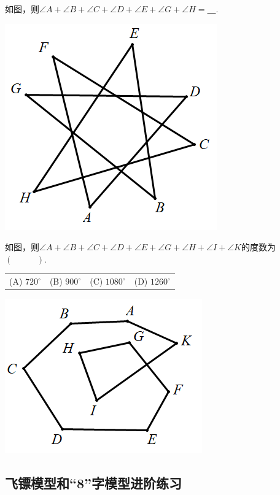 \documentclass[10pt,twocolumn]{ctexart}
\newcommand{\onech}[4]{
\renewcommand\arraystretch{1.4}
\begin{tabularx}{\linewidth}{XXXX}
\setlength\tabcolsep{0pt}
(A) #1 & (B) #2 & (C) #3 & (D) #4 \\
\end{tabularx}
\unskip \unskip}
\begin{document}
\begin{shaded}
\begin{example}
如图，则$\angle A+\angle B+\angle C+\angle D+\angle E+\angle G+\angle H=$\underline{~\hspace{1cm}~}.
\end{example}
\end{shaded}
 \includegraphics[scale=0.5]{figure/bazhi07.PNG}
\begin{shaded}
\begin{example}
如图，则$\angle A+\angle B+\angle C+\angle D+\angle E+\angle G+\angle H+\angle I+\angle K$的度数为$(~\hspace{1cm}~)$.\\
\onech{$720^\circ$}{$900^\circ$}{$1080^\circ$}{$1260^\circ$}
\end{example}
\end{shaded}
 \includegraphics[scale=0.5]{figure/bazhi08.PNG}
\subsection{飞镖模型和“8”字模型进阶练习}
\end{document}
